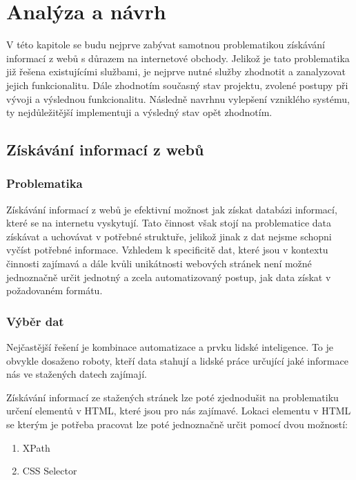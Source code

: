 \documentclass[thesis=B,czech]{FITthesis}[2012/06/26]
\begin{document}
\newpage


\chapter{Analýza a návrh}

V této kapitole se budu nejprve zabývat samotnou problematikou získávání informací 
z webů s důrazem na internetové obchody.
Jelikož je tato problematika již řešena existujícími službami, je nejprve nutné služby zhodnotit a zanalyzovat jejich funkcionalitu.
Dále zhodnotím současný stav projektu, zvolené postupy při vývoji a výslednou funkcionalitu.
Následně navrhnu vylepšení vzniklého systému, ty nejdůležitější implementuji a výsledný stav opět zhodnotím.

\section{Získávání informací z webů}

\subsection{Problematika}
Získávání informací z webů je efektivní možnost jak získat databázi informací, které se na internetu vyskytují.
Tato činnost však stojí na problematice data získávat a uchovávat v potřebné struktuře, jelikož 
jinak z dat nejsme schopni vyčíst potřebné informace.
Vzhledem k specificitě dat, které jsou v kontextu činnosti zajímavá a dále kvůli unikátnosti webových stránek
není možné jednoznačně určit jednotný a zcela automatizovaný postup, jak data získat v požadovaném formátu.

\newpage

\subsection{Výběr dat}
Nejčastější řešení je kombinace automatizace a prvku lidské inteligence.
To je obvykle dosaženo roboty, kteří data stahují a lidské práce určující jaké informace nás ve stažených datech zajímají.
\par
Získávání informací ze stažených stránek lze poté zjednodušit na problematiku určení elementů v HTML, které jsou pro 
nás zajímavé.
Lokaci elementu v HTML se kterým je potřeba pracovat lze poté jednoznačně určit pomocí dvou možností:
\begin{enumerate}
\item XPath
\item CSS Selector
\end{enumerate}
\end{document}

